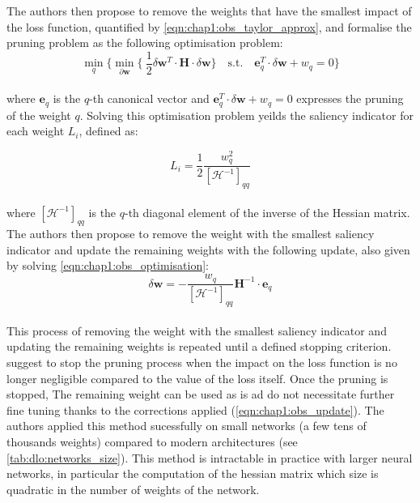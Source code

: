 \noindent The authors then propose to remove the weights that have the smallest
impact of the loss function, quantified by \cref{eqn:chap1:obs_taylor_approx},
and formalise the pruning problem as the following optimisation problem:\\

\begin{equation}
  \label{eqn:chap1:obs_optimisation}
  \min_{q}\{\min_{\partial \mathbf{w}} \{\ \frac{1}{2} \delta \mathbf{w}^T \cdot \mathbf{H} \cdot \delta \mathbf{w} \} \quad \text{s.t.} \quad  \mathbf{e}_q^T \cdot \delta \mathbf{w} + w_q = 0\} 
\end{equation}\\

\noindent where $\mathbf{e}_q$ is the $q$-th canonical vector and
$\mathbf{e}_q^T \cdot \delta \mathbf{w} + w_q = 0$ expresses the pruning of
the weight $q$. Solving this optimisation problem yeilds the saliency
indicator for each weight $L_i$, defined as:

\begin{equation}
  L_i = \frac{1}{2} \frac{w_q^2}{[\mathcal{H}^{-1}]_{qq}}
\end{equation}\\

\noindent where $[\mathcal{H}^{-1}]_{qq}$ is the $q$-th diagonal element of the
inverse of the Hessian matrix. The authors then propose to remove the weight
with the smallest saliency indicator and update the remaining weights with the
following update, also given by solving \cref{eqn:chap1:obs_optimisation}:\\

\begin{equation}
  \label{eqn:chap1:obs_update}
  \delta \mathbf{w} = - \frac{w_q}{[\mathcal{H}^{-1}]_{qq}} \mathbf{H}^{-1} \cdot \mathbf{e}_q
\end{equation}\\

This process of removing the weight with the smallest saliency indicator and
updating the remaining weights is repeated until a defined stopping criterion.
\citeauthor{DBLP:conf/nips/HassibiS92} suggest to stop the pruning process when
the impact on the loss function is no longer negligible compared to the value of
the loss itself. Once the pruning is stopped, The remaining weight can be used
as is ad do not necessitate further fine tuning thanks to the corrections
applied (\cref{eqn:chap1:obs_update}). The authors applied this method
sucessfully on small networks (a few tens of thousands weights) compared to
modern architectures (see \cref{tab:dlo:networks_size}). This method is
intractable in practice with larger neural networks, in particular the
computation of the hessian matrix which size is quadratic in the number of
weights of the network.\\

